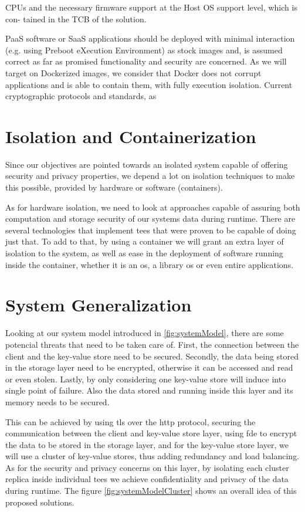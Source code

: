 CPUs and the necessary firmware support at the Host OS support level, which is con-
tained in the TCB of the solution.

PaaS software or SaaS applications should be deployed with minimal interaction (e.g.
using Preboot eXecution Environment) as stock images and, is assumed correct as far
as promised functionality and security are concerned. As we will target on Dockerized
images, we consider that Docker does not corrupt applications and is able to contain
them, with fully execution isolation. Current cryptographic protocols and standards, as


\section{Isolation and Containerization} %
\label{sec:importing_images}

Since our objectives are pointed towards an isolated system capable of offering security and privacy properties, we depend a lot on isolation techniques to make this possible, provided by hardware or software (containers). 

As for hardware isolation, we need to look at approaches capable of assuring both computation and storage security of our systems data during runtime. There are several technologies that implement \gls{tee}s that were proven to be capable of doing just that.
To add to that, by using a container we will grant an extra layer of isolation to the system, as well as ease in the deployment of software running inside the container, whether it is an \gls{os}, a library \gls{os} or even entire applications.


\section{System Generalization} %

Looking at our system model introduced in \ref{fig:systemModel}, there are some potencial threats that need to be taken care of. 
First, the connection between the client and the key-value store need to be secured. Secondly, the data being stored in the storage layer need to be encrypted, otherwise it can be accessed and read or even stolen. Lastly, by only considering one key-value store will induce into single point of failure. Also the data stored and running inside this layer and its memory needs to be secured.

This can be achieved by using \gls{tls} over the \gls{http} protocol, securing the communication between the client and key-value store layer, using \gls{fde} to encrypt the data to be stored in the storage layer, and for the key-value store layer, we will use a cluster of key-value stores, thus adding redundancy and load balancing. As for the security and privacy concerns on this layer, by isolating each cluster replica inside individual \gls{tee}s we achieve confidentiality and privacy of the data during runtime. The figure \ref{fig:systemModelCluster} shows an overall idea of this proposed solutions.

